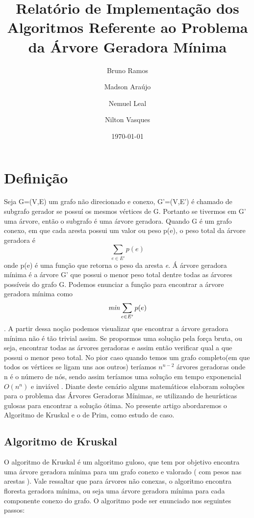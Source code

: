 \documentclass[a4paper,12pt]{article}
\begin{document}
\title{Relatório de Implementação dos Algoritmos Referente ao Problema da Árvore Geradora Mínima}
\author{Bruno Ramos \and Madson Araújo \and Nemuel Leal \and Nilton Vasques}
\date{\today}
\maketitle

\section{Definição}
Seja G=(V,E) um grafo não direcionado e conexo, G'=(V,E') é chamado de subgrafo gerador se possuí os mesmos vértices de G. Portanto se tivermos em G' uma árvore, então o subgrafo é uma árvore geradora. 
Quando G é um grafo conexo, em que cada aresta possui um valor ou peso p(e), o peso total da árvore geradora é \[\sum_{e \in E'}p(e)\] onde p(e) é uma função que retorna o peso da aresta \emph{e}. Á árvore geradora mínima é a árvore G' que possui o menor peso total dentre todas as árvores possíveis do grafo G\cite{nogueira}. Podemos enunciar a função para encontrar a árvore geradora mínima como \[\emph{min}\sum_{e\in E'}p(e)\].
A partir dessa noção podemos visualizar que encontrar a árvore geradora mínima não é tão trivial assim. Se propormos uma solução pela força bruta, ou seja, encontrar todas as árvores geradoras e assim então verificar qual a que possui o menor peso total. No pior caso quando temos um grafo completo(em que todos os vértices se ligam uns aos outros) teríamos $n^{n-2}$ árvores geradoras onde n é o número de nós, sendo assim teríamos uma solução em tempo exponencial $O(n^n)$ e inviável \nocite{*}.
Diante deste cenário alguns matemáticos elaboram soluções para o problema das Árvores Geradoras Mínimas, se utilizando de heurísticas gulosas para encontrar a solução ótima. No presente artigo abordaremos o Algoritmo de Kruskal e o de Prim, como estudo de caso.

\subsection{Algoritmo de Kruskal}
O algoritmo de Kruskal é um algoritmo guloso, que tem por objetivo encontra uma árvore geradora mínima para um grafo conexo e valorado ( com pesos nas arestas ). Vale ressaltar que para árvores não conexas, o algoritmo encontra floresta geradora mínima, ou seja uma árvore geradora mínima para cada componente conexo do grafo. O algoritmo pode ser enunciado nos seguintes passos:
\end{document}

